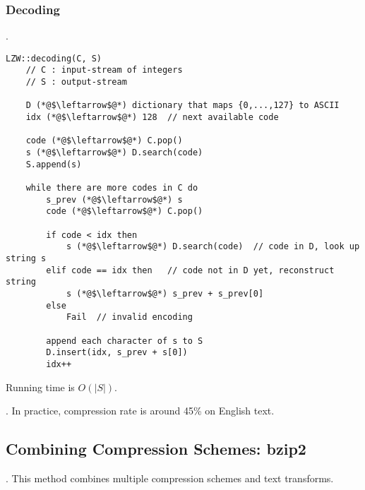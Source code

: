 \documentclass{article}
\begin{document}
\subsubsection{Decoding}

\begin{codes}[].
    \begin{lstlisting}[style=cppstyle]
    LZW::decoding(C, S)
    // C : input-stream of integers
    // S : output-stream
    
    D (*@$\leftarrow$@*) dictionary that maps {0,...,127} to ASCII
    idx (*@$\leftarrow$@*) 128  // next available code
    
    code (*@$\leftarrow$@*) C.pop()
    s (*@$\leftarrow$@*) D.search(code)
    S.append(s)
    
    while there are more codes in C do
        s_prev (*@$\leftarrow$@*) s
        code (*@$\leftarrow$@*) C.pop()
    
        if code < idx then
            s (*@$\leftarrow$@*) D.search(code)  // code in D, look up string s
        elif code == idx then   // code not in D yet, reconstruct string
            s (*@$\leftarrow$@*) s_prev + s_prev[0]
        else
            Fail  // invalid encoding
    
        append each character of s to S
        D.insert(idx, s_prev + s[0])
        idx++
    \end{lstlisting}
    Running time is $O(|S|)$. 
\end{codes}

\begin{comm}[].
    In practice, compression rate is around 45\% on English text. 
\end{comm}

\subsection{Combining Compression Schemes: bzip2}

\begin{thmm}[].
    This method combines multiple compression schemes and text transforms.
\end{thmm}
\end{document}
